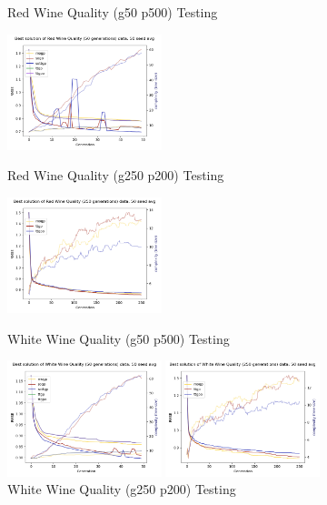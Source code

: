 \documentclass[a4paper, twocolumn]{article}
\begin{document}
\begin{figure}[!htb]
	\caption{Red Wine Quality (g50 p500) Testing}
	\includegraphics[width=0.40\textwidth]{Red Wine Quality (50 generations)-best-evo}
	\caption{Red Wine Quality (g250 p200) Testing}
	\includegraphics[width=0.40\textwidth]{Red Wine Quality (250 generations)-best-evo}
	\caption{White Wine Quality (g50 p500) Testing}
	\includegraphics[width=0.40\textwidth]{White Wine Quality (50 generations)-best-evo}
	\caption{White Wine Quality (g250 p200) Testing}
	\includegraphics[width=0.40\textwidth]{White Wine Quality (250 generations)-best-evo}
\end{figure}
\end{document}

